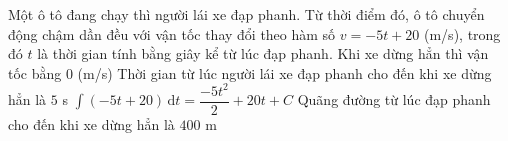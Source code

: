 \begin{ex}%
	Một ô tô đang chạy thì người lái xe đạp phanh. Từ thời điểm đó, ô tô chuyển động chậm dần đều với vận tốc thay đổi theo hàm số $v=-5t+20$ (m/s), trong  đó $t$ là thời gian tính bằng giây kể từ lúc đạp phanh.
	 \choiceTF
		{\True Khi xe dừng hẳn thì vận  tốc bằng $0$ (m/s)}
		 {Thời gian từ lúc người lái xe đạp phanh cho đến khi xe dừng hẳn là $5$ s}
		 {\True $\displaystyle\int(-5t+20) \mathrm{\,d}t=\dfrac{-5t^2}{2}+20t+C$}
		{Quãng đường từ lúc đạp phanh cho đến khi xe dừng  hẳn là $400$ m}
\end{ex}

